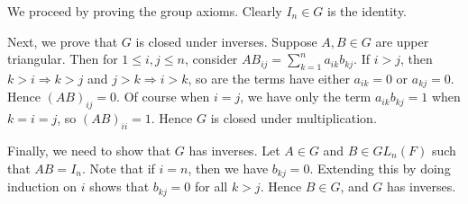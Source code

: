\documentclass[12pt]{article}
\theoremstyle{remark}
\theoremstyle{named}
\renewcommand{\implies}{\Rightarrow}
\begin{document}
\begin{enumerate}
    We proceed by proving the group axioms. Clearly \(I_n \in G\) is the identity.
    
    Next, we prove that \(G\) is closed under inverses. Suppose \(A, B \in G\) are upper triangular. Then for \(1 \le i, j \le n\), consider \(AB_{ij} = \sum_{k = 1}^n a_{ik}b_{kj}\). If \(i > j\), then \(k > i \implies k > j\) and \(j > k \implies i > k\), so are the terms have either \(a_{ik} = 0\) or \(a_{kj} = 0\). Hence \((AB)_{ij} = 0\). Of course when \(i = j\), we have only the term \(a_{ik}b_{kj} = 1\) when \(k = i = j\), so \((AB)_{ii} = 1\). Hence \(G\) is closed under multiplication.

    Finally, we need to show that \(G\) has inverses. Let \(A\in G\) and \(B \in GL_n(F)\) such that \(AB = I_n\). Note that if \(i = n\), then we have \(b_{kj} = 0\). Extending this by doing induction on \(i\) shows that \(b_{kj} = 0\) for all \(k > j\). Hence \(B \in G\), and \(G\) has inverses. 


\end{enumerate}

% 
        
        
\end{document}
